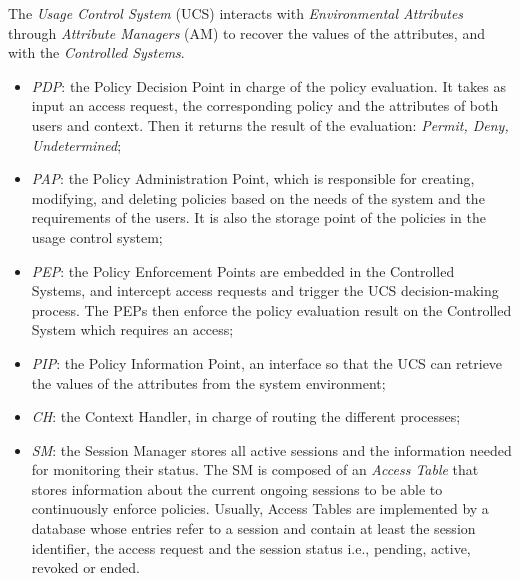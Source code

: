 The \emph{Usage Control System} (UCS) interacts with \emph{Environmental Attributes} through \emph{Attribute Managers} (AM) to recover the values of the attributes, and with the \emph{Controlled Systems}. 
\begin{itemize}
    \item \emph{PDP}: the Policy Decision Point in charge of the policy evaluation. It takes as input an access request, 
    the corresponding policy and the attributes of both users and context. Then it returns the result of the evaluation: \emph{Permit, Deny, Undetermined};
    \item \emph{PAP}: the Policy Administration Point, which is responsible for creating, modifying, and deleting policies based on the needs of the system and the requirements of the users. It is also the storage point of the policies in the usage control system;
    \item \emph{PEP}: the Policy Enforcement Points are embedded in the Controlled Systems, and intercept access requests and trigger the UCS decision-making process. The PEPs then enforce the policy evaluation result on the Controlled System which requires an access;
    \item \emph{PIP}: the Policy Information Point, an interface so that the UCS can retrieve the values of the attributes from the system environment;
    \item \emph{CH}: the Context Handler, in charge of routing the different processes;
    \item \emph{SM}: the Session Manager stores all active sessions and the information needed for monitoring their status. The SM is composed of an \emph{Access Table} that stores information about the current ongoing sessions to be able to continuously enforce policies. Usually, Access Tables are implemented by a database whose entries refer to a session and contain at least the session identifier, the access request and the session status i.e., pending, active, revoked or ended.
\end{itemize}


